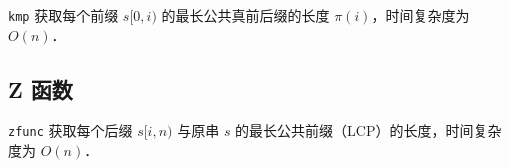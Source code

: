 {\tt kmp} 获取每个前缀 $s[0, i)$ 的最长公共真前后缀的长度 $\pi(i)$，时间复杂度为 $O(n)$．



\subsection{Z 函数}

{\tt zfunc} 获取每个后缀 $s[i, n)$ 与原串 $s$ 的最长公共前缀（LCP）的长度，时间复杂度为 $O(n)$．



\newpage

